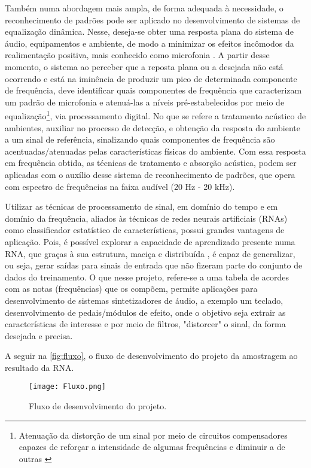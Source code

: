 Também numa abordagem mais ampla, de forma adequada à necessidade, o reconhecimento de padrões pode ser aplicado no desenvolvimento de sistemas de equalização dinâmica. Nesse, deseja-se obter uma resposta plana do sistema de áudio, equipamentos e ambiente, de modo a minimizar os efeitos incômodos da realimentação positiva, mais conhecido como microfonia \cite{valle2002}. A partir desse momento, o sistema ao perceber que a reposta plana ou a desejada não está ocorrendo e está na iminência de produzir um pico de determinada componente de frequência, deve identificar quais componentes de frequência que caracterizam um padrão de microfonia e atenuá-las a níveis pré-estabelecidos por meio de equalização\footnote{Atenuação da distorção de um sinal por meio de circuitos compensadores capazes de reforçar a intensidade de algumas frequências e diminuir a de outras \cite{dicio2014}}, via processamento digital. No que se refere a tratamento acústico de ambientes, auxiliar no processo de detecção, e obtenção da resposta do ambiente a um sinal de referência, sinalizando quais componentes de frequência são acentuadas/atenuadas pelas características físicas do ambiente. Com essa resposta em frequência obtida, as técnicas de tratamento e absorção acústica, podem ser aplicadas com o auxílio desse sistema de reconhecimento de padrões, que opera com espectro de frequências na faixa audível (20 Hz - 20 kHz).

Utilizar as técnicas de processamento de sinal, em domínio do tempo e em domínio da frequência, aliados às técnicas de redes neurais artificiais (RNAs) como classificador estatístico de características, possui grandes vantagens de aplicação. Pois, é possível explorar a capacidade de aprendizado presente numa RNA, que graças à sua estrutura, maciça e distribuída \cite{haykin2001}, é capaz de generalizar, ou seja, gerar saídas para sinais de entrada que não fizeram parte do conjunto de dados do treinamento. O que nesse projeto, refere-se a uma tabela de acordes com as notas (frequências) que os compõem, permite aplicações para desenvolvimento de sistemas sintetizadores de áudio, a exemplo um teclado, desenvolvimento de pedais/módulos de efeito, onde o objetivo seja extrair as características de interesse e por meio de filtros, "distorcer" o sinal, da forma desejada e precisa.

A seguir na \autoref{fig:fluxo}, o fluxo de desenvolvimento do projeto da amostragem ao resultado da RNA.

\begin{figure}[H]
   \begin{center}   
      \caption{Fluxo de desenvolvimento do projeto.}
      \label{fig:fluxo}
      \texttt{[image: Fluxo.png]}
    \end{center}
\end{figure}
